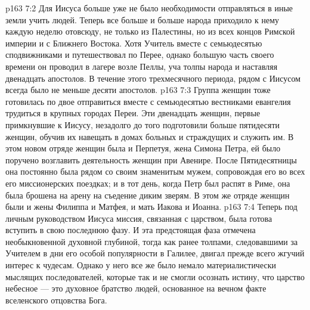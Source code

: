 \vs p163 7:2 Для Иисуса больше уже не было необходимости отправляться в иные земли учить людей. Теперь все больше и больше народа приходило к нему каждую неделю отовсюду, не только из Палестины, но из всех концов Римской империи и с Ближнего Востока. Хотя Учитель вместе с семьюдесятью сподвижниками и путешествовал по Перее, однако большую часть своего времени он проводил в лагере возле Пеллы, уча толпы народа и наставляя двенадцать апостолов. В течение этого трехмесячного периода, рядом с Иисусом всегда было не меньше десяти апостолов.
\vs p163 7:3 Группа женщин тоже готовилась по двое отправиться вместе с семьюдесятью вестниками евангелия трудиться в крупных городах Переи. Эти двенадцать женщин, первые примкнувшие к Иисусу, незадолго до того подготовили больше пятидесяти женщин, обучив их навещать в домах больных и страждущих и служить им. В этом новом отряде женщин была и Перпетуя, жена Симона Петра, ей было поручено возглавить деятельность женщин при Авенире. После Пятидесятницы она постоянно была рядом со своим знаменитым мужем, сопровождая его во всех его миссионерских поездках; и в тот день, когда Петр был распят в Риме, она была брошена на арену на съедение диким зверям. В этом же отряде женщин были и жены Филиппа и Матфея, и мать Иакова и Иоанна.
\vs p163 7:4 Теперь под личным руководством Иисуса миссия, связанная с царством, была готова вступить в свою последнюю фазу. И эта предстоящая фаза отмечена необыкновенной духовной глубиной, тогда как ранее толпами, следовавшими за Учителем в дни его особой популярности в Галилее, двигал прежде всего жгучий интерес к чудесам. Однако у него все же было немало материалистически мыслящих последователей, которые так и не смогли осознать истину, что царство небесное --- это духовное братство людей, основанное на вечном факте вселенского отцовства Бога.
